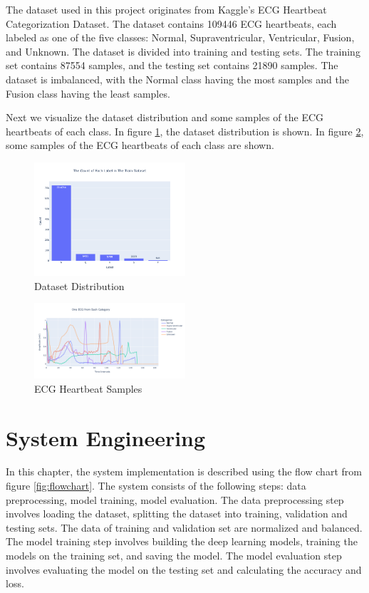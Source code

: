 \documentclass[conference]{IEEEtran}
\begin{document}
The dataset used in this project originates from Kaggle's ECG Heartbeat Categorization Dataset. The dataset contains 109446 ECG heartbeats, each labeled as one of the five classes: Normal, Supraventricular, Ventricular, Fusion, and Unknown. The dataset is divided into training and testing sets. The training set contains 87554 samples, and the testing set contains 21890 samples. The dataset is imbalanced, with the Normal class having the most samples and the Fusion class having the least samples. 

Next we visualize the dataset distribution and some samples of the ECG heartbeats of each class. In figure \ref{fig:dataset_distribution}, the dataset distribution is shown. In figure \ref{fig:ecg_samples}, some samples of the ECG heartbeats of each class are shown.

\begin{figure}[htbp]
    \centering
    \includegraphics[width=0.5\textwidth]{images/distribution-classes-bar.png}
    \caption{Dataset Distribution}
    \label{fig:dataset_distribution}
\end{figure}

\begin{figure}[htbp]
    \centering
    \includegraphics[width=0.5\textwidth]{images/one-ecg-per-class.png}
    \caption{ECG Heartbeat Samples}
    \label{fig:ecg_samples}
\end{figure}


\section{System Engineering}
In this chapter, the system implementation is described using the flow chart from figure \ref{fig:flowchart}. The system consists of the following steps: data preprocessing, model training, model evaluation. The data preprocessing step involves loading the dataset, splitting the dataset into training, validation and testing sets. The data of training and validation set are normalized and balanced. The model training step involves building the deep learning models, training the models on the training set, and saving the model. The model evaluation step involves evaluating the model on the testing set and calculating the accuracy and loss. 
\end{document}
